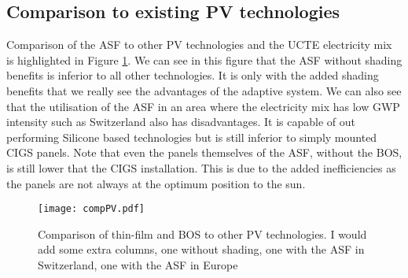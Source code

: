 


\subsection{Comparison to existing PV technologies}

Comparison of the ASF to other PV technologies and the UCTE electricity mix is highlighted in Figure \ref{fig:compPV}. We can see in this figure that the ASF without shading benefits is inferior to all other technologies. It is only with the added shading benefits that we really see the advantages of the adaptive system. 
We can also see that the utilisation of the ASF in an area where the electricity mix has low GWP intensity such as Switzerland also has disadvantages. It is capable of out performing Silicone based technologies but is still inferior to simply mounted CIGS panels. Note that even the panels themselves of the ASF, without the BOS, is still lower that the CIGS installation. This is due to the added inefficiencies as the panels are not always at the optimum position to the sun.


\begin{figure}[H]
\begin{center}
\texttt{[image: compPV.pdf]}
\caption{Comparison of thin-film and BOS to other PV technologies. I would add some extra columns, one without shading, one with the ASF in Switzerland, one with the ASF in Europe}
\label{fig:compPV}
\end{center}
\end{figure}




